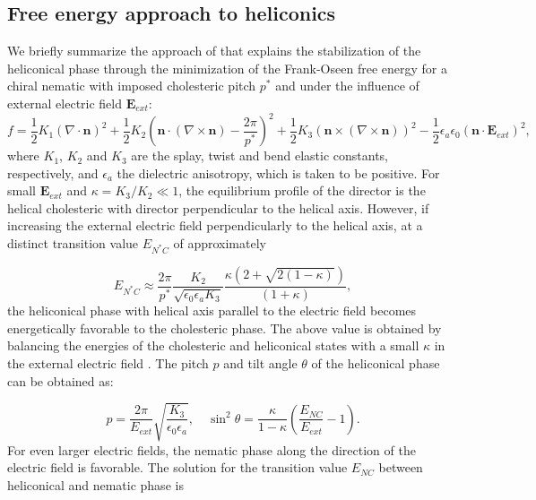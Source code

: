 \documentclass{osa-article}
\renewcommand{\vec}[1]{\mathbf{#1}}
\begin{document}
\subsection{Free energy approach to heliconics}

We briefly summarize the approach of \cite{MeyerRB_ApplPhysLett12_1968,XiangJ_PhysRevLett112_2014} that explains the stabilization of the heliconical phase 
through the minimization of the Frank-Oseen free energy for a chiral nematic with imposed cholesteric pitch $p^{\ast}$ and under the influence of external electric field $\vec{E}_{ext}$: 
\begin{equation}
  f = \dfrac{1}{2} K_1 (\nabla \cdot \vec{n})^2 + \dfrac{1}{2} K_2 (\vec{n} \cdot ( \nabla \times \vec{n} ) - \dfrac{2 \pi}{p^{\ast}})^2 + \dfrac{1}{2} K_3 \left(\vec{n} \times ( \nabla \times \vec{n}) \right)^2 -\dfrac{1}{2} \epsilon_a \epsilon_0 (\vec{n}\cdot \vec{E}_{ext})^2,
\end{equation}
where $K_1$, $K_2$ and $K_3$ are the splay, twist and bend elastic constants, respectively, and $\epsilon_a$ the dielectric anisotropy, which is taken to be positive.
For small $\vec{E}_{ext}$ and $\kappa = K_3 / K_2 \ll 1$, the equilibrium profile of the director is the helical cholesteric with director perpendicular to the helical axis. 
However, if increasing the external electric field perpendicularly to the helical axis, at a distinct transition value $E_{N^{\ast}C}$ of approximately 

\begin{equation}
  E_{N^{\ast}C} \approx \dfrac{2 \pi}{p^{\ast}} \dfrac{K_2}{\sqrt{\epsilon_0 \epsilon_a K_3}} \dfrac{\kappa (2+\sqrt{2(1-\kappa)})}{(1+\kappa)},
\end{equation}
the heliconical phase with helical axis parallel to the electric field becomes energetically favorable to the cholesteric phase. 
The above value is obtained by balancing the energies of the cholesteric and heliconical states with a small $\kappa$ in the external electric field \cite{XiangJ_PhysRevLett112_2014}.
The pitch $p$ and tilt angle $\theta$ of the heliconical phase can be obtained as: 

\begin{equation}
  p = \dfrac{2 \pi}{E_{ext}} \sqrt{\dfrac{K_3}{\epsilon_0 \epsilon_a}}, \quad \sin^2 \theta = \dfrac{\kappa}{1-\kappa}\left( \dfrac{E_{NC}}{E_{ext}} -1 \right).
  \label{eq:pitch-theta}
\end{equation}
For even larger electric fields, the nematic phase along the direction of the electric field is favorable. 
The solution for the transition value $E_{NC}$ between heliconical and nematic phase is 
\end{document}
